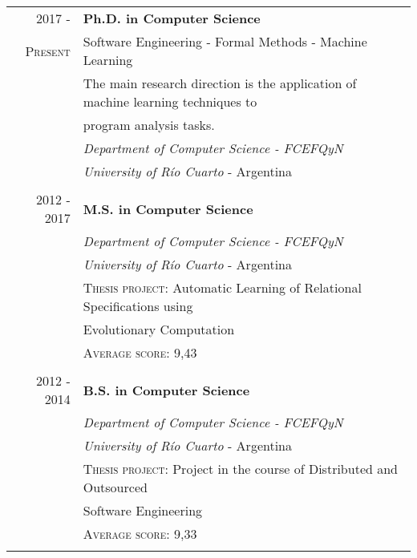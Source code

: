 \documentclass[a4paper,10pt]{article} %
\begin{document}
\begin{tabular}{rl}
\\
\textsc{2017 -}	& \textbf{Ph.D. in Computer Science} \\
\textsc{Present}  & Software Engineering - Formal Methods - Machine Learning \\
& The main research direction is the application of machine learning techniques to \\ 
& program analysis tasks. \\
& \textit{Department of Computer Science - FCEFQyN} \\ & \textit{University of Río Cuarto} - Argentina \\ & \\

\textsc{2012 - 2017}	& \textbf{M.S. in Computer Science} \\
 & \textit{Department of Computer Science - FCEFQyN} \\ & \textit{University of Río Cuarto} - Argentina \\ 
& \textsc{Thesis project:} Automatic Learning of Relational Specifications using \\ & Evolutionary Computation \\ & \textsc{Average score:} 9,43 \\ & \\

\textsc{2012 - 2014}	& \textbf{B.S. in Computer Science} \\
 					& \textit{Department of Computer Science - FCEFQyN} \\ & \textit{University of Río Cuarto} - Argentina \\
& \textsc{Thesis project:} Project in the course of Distributed and Outsourced \\ & Software Engineering \\ & \textsc{Average score:} 9,33 \\ \\ 

\end{tabular}
\end{document}
